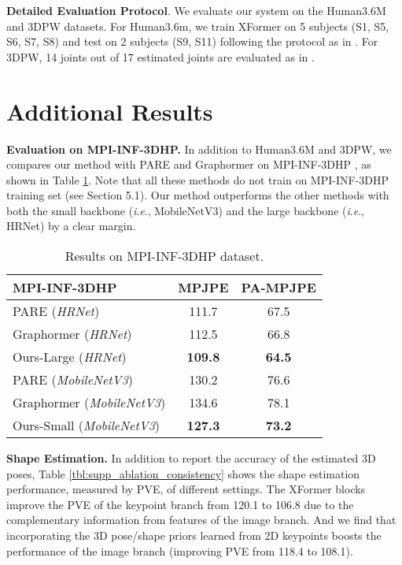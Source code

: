 \documentclass{article}
\newcommand{\ie}{\textit{i}.\textit{e}.}
\newcommand\mypara[1]{\noindent\textbf{#1}}
\begin{document}
\mypara{Detailed Evaluation Protocol}. We evaluate our system on the Human3.6M \cite{ionescu2013human3} and 3DPW \cite{von2018recovering} datasets. For Human3.6m, we train XFormer on 5 subjects (S1, S5, S6, S7, S8) and test on 2 subjects (S9, S11) following the protocol as in \cite{kanazawa2018endtoend,pavlakos_volumetric_cvpr17}. For 3DPW, 14 joints out of 17 estimated joints are evaluated as in \cite{kanazawa2018endtoend,pavlakos2018humanshape,kolotouros2019learning,kolotouros2019convolutional}.


\section{Additional Results}

\mypara{Evaluation on MPI-INF-3DHP.}
In addition to Human3.6M and 3DPW, we compares our method with PARE and Graphormer on MPI-INF-3DHP \cite{mehta2017monocular}, as shown in Table \ref{tab:3DHP}. Note that all these methods do not train on MPI-INF-3DHP training set (see Section 5.1). Our method outperforms the other methods with both the small backbone (\ie, MobileNetV3) and the large backbone (\ie, HRNet) by a clear margin.

\begin{table}[h]
\footnotesize
\renewcommand{\tabcolsep}{2pt}
\centering
\begin{tabular}{lcc}
\toprule
MPI-INF-3DHP & MPJPE & PA-MPJPE  \\ 
\midrule
PARE (\textit{HRNet})      &   111.7   &  67.5   \\
Graphormer (\textit{HRNet})      &   112.5   &  66.8   \\
Ours-Large (\textit{HRNet}) &   \textbf{109.8}   &  \textbf{64.5}  \\
\midrule
PARE (\textit{MobileNetV3})    &  130.2  &  76.6  \\  
Graphormer (\textit{MobileNetV3})    &   134.6   &  78.1   \\  
Ours-Small (\textit{MobileNetV3}) &   \textbf{127.3}   &  \textbf{73.2 } \\
\bottomrule
\end{tabular}
\caption{ Results on MPI-INF-3DHP dataset.}
\label{tab:3DHP}
\end{table}

\mypara{Shape Estimation.} 
In addition to report the accuracy of the estimated 3D poses, Table \ref{tbl:supp_ablation_consistency} shows the shape estimation performance, measured by PVE, of different settings. The XFormer blocks improve the PVE of the keypoint branch from 120.1 to 106.8 due to the complementary information from features of the image branch. And we find that incorporating the 3D pose/shape priors learned from 2D keypoints boosts the performance of the image branch (improving PVE from 118.4 to 108.1).
\end{document}
